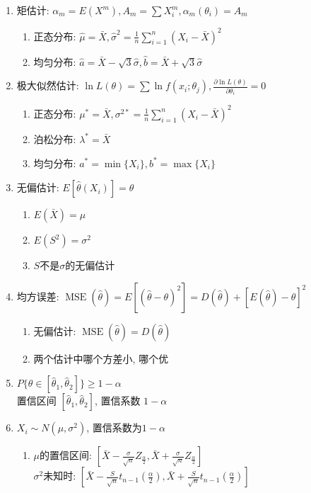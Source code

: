 \documentclass[10pt,a4paper,nofonts]{ctexart}
\renewcommand{\ge}{\geqslant}
\DeclareMathOperator{\MSE}{MSE}
\begin{document}
\begin{multicols}{2}
\begin{enumerate}
\item 矩估计: $\alpha_m=E(X^m), A_m=\sum X_i^m, \alpha_m(\theta_i)=A_m$
\begin{enumerate}
\item 正态分布: $\hat\mu=\bar{X}, \hat\sigma^2=\frac{1}{n}\sum_{i=1}^n(X_i-\bar{X})^2$
\item 均匀分布: $\hat a=\bar{X}-\sqrt{3}\hat\sigma, \hat b=\bar{X}+\sqrt{3}\hat\sigma$
\end{enumerate}
\item 极大似然估计: $\ln L(\theta)=\sum \ln f(x_i; \theta_j), \frac{\partial\ln L(\theta)}{\partial\theta_i}=0$
\begin{enumerate}
\item 正态分布: $\mu^*=\bar{X}, \sigma^{2*}=\frac{1}{n}\sum_{i=1}^n(X_i-\bar{X})^2$
\item 泊松分布: $\lambda^*=\bar{X}$
\item 均匀分布: $a^*=\min\{X_i\}, b^*=\max\{X_i\}$
\end{enumerate}
\item 无偏估计: $E[\hat\theta(X_i)]=\theta$
\begin{enumerate}
\item $E(\bar{X})=\mu$
\item $E(S^2)=\sigma^2$
\item $S$不是$\sigma$的无偏估计
\end{enumerate}
\item 均方误差: $\MSE(\hat\theta)=E[(\hat\theta-\theta)^2]=D(\hat\theta)+[E(\hat\theta)-\theta]^2$
\begin{enumerate}
\item 无偏估计: $\MSE(\hat\theta)=D(\hat\theta)$
\item 两个估计中哪个方差小, 哪个优
\end{enumerate}
\item $P\{\theta\in[\hat\theta_1,\hat\theta_2]\}\ge1-\alpha$\\
置信区间 $[\hat\theta_1,\hat\theta_2]$, 置信系数 $1-\alpha$
\item $X_i\sim N(\mu,\sigma^2)$, 置信系数为$1-\alpha$
\begin{enumerate}
\item $\mu$的置信区间: $[\bar{X}-\frac{\sigma}{\sqrt{n}}Z_{\frac{\alpha}{2}},\bar{X}+\frac{\sigma}{\sqrt{n}}Z_{\frac{\alpha}{2}}]$\\
$\sigma^2$未知时: $[\bar{X}-\frac{S}{\sqrt{n}}t_{n-1}(\frac{\alpha}{2}),\bar{X}+\frac{S}{\sqrt{n}}t_{n-1}(\frac{\alpha}{2})]$

\end{enumerate}
\end{enumerate}
\end{multicols}
\end{document}
